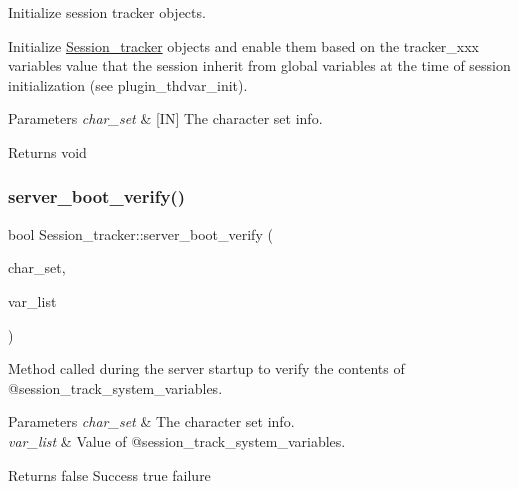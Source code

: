 Initialize session tracker objects. 

Initialize \mbox{\hyperlink{classSession__tracker}{Session\+\_\+tracker}} objects and enable them based on the tracker\+\_\+xxx variables\textquotesingle{} value that the session inherit from global variables at the time of session initialization (see plugin\+\_\+thdvar\+\_\+init).


\begin{DoxyParams}{Parameters}
{\em char\+\_\+set} & \mbox{[}IN\mbox{]} The character set info.\\
\hline
\end{DoxyParams}
\begin{DoxyReturn}{Returns}
void 
\end{DoxyReturn}
\mbox{\label{classSession__tracker_a8763d1413a6a2a425fc9541fd2098178}} 
\subsubsection{\texorpdfstring{server\+\_\+boot\+\_\+verify()}{server\_boot\_verify()}}
{\footnotesize\ttfamily bool Session\+\_\+tracker\+::server\+\_\+boot\+\_\+verify (\begin{DoxyParamCaption}\item[{const C\+H\+A\+R\+S\+E\+T\+\_\+\+I\+N\+FO $\ast$}]{char\+\_\+set,  }\item[{L\+E\+X\+\_\+\+S\+T\+R\+I\+NG}]{var\+\_\+list }\end{DoxyParamCaption})}



Method called during the server startup to verify the contents of @session\+\_\+track\+\_\+system\+\_\+variables. 


\begin{DoxyParams}{Parameters}
{\em char\+\_\+set} & The character set info. \\
\hline
{\em var\+\_\+list} & Value of @session\+\_\+track\+\_\+system\+\_\+variables.\\
\hline
\end{DoxyParams}
\begin{DoxyReturn}{Returns}
false Success true failure 
\end{DoxyReturn}
\mbox{\label{classSession__tracker_ac0a967ff6aac07ea844b322abfa1b8de}} 
